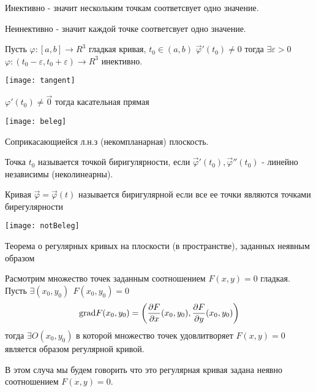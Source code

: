 \begin{define}
  Инективно - значит нескольким точкам соответсвует одно значение.

  Неинективно - значит каждой точке соответсвует одно значение.
\end{define}

\begin{theorem}
  Пусть $\varphi : [a,b] \to R^3$ гладкая кривая, $t_0 \in (a,b)$
  $\vec \varphi' (t_0) \not = 0$ тогда $\exists \varepsilon > 0$
  $\varphi : (t_0 - \varepsilon, t_0 + \varepsilon) \to R^3$ инективно.
\end{theorem}

\begin{define}
  \texttt{[image: tangent]}

  $\varphi' (t_0) \not = \vec 0$ тогда касательная прямая
\end{define}

\begin{define}
  \texttt{[image: beleg]}

  Соприкасающиейся  л.н.з (некомпланарная) плоскость.
\end{define}

\begin{define}
  Точка $t_0$ называется точкой биригулярности, если $\vec \varphi' (t_0),
  \vec \varphi''(t_0)$ - линейно независимы (неколинеарны).
\end{define}

\begin{define}
  Кривая $\vec \varphi = \vec \varphi(t)$ называется биригулярной если все ее
  точки являются точками бирегулярности

  \texttt{[image: notBeleg]}
\end{define}

\begin{title}[\Large]
  Теорема о регулярных кривых на плоскости (в пространстве), заданных неявным
  образом
\end{title}

\begin{theorem}
  Расмотрим множество точек заданным соотношением $F(x, y) = 0$ гладкая.
  Пусть $\exists (x_0, y_0) ~~ F(x_0, y_0) = 0$
  $$
  \mathrm{grad} F(x_0, y_0) = \left( \frac{\partial F}{\partial x}(x_0, y_0),
  \frac{\partial F}{\partial y}(x_0, y_0) \right)
  $$
  тогда $\exists O(x_0, y_0)$ в которой множество точек удовлитворяет
  $F(x, y) = 0$ является образом регулярной кривой.

  В этом случа мы будем говорить что это регулярная кривая задана неявно
  соотношением $F(x, y) = 0$.
\end{theorem}

